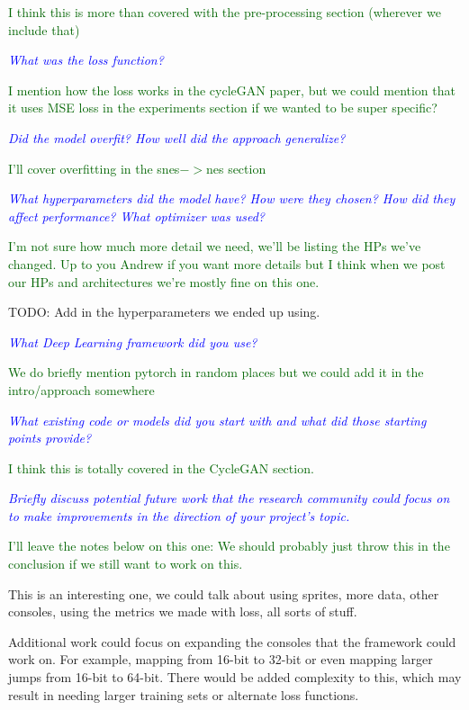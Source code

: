 \documentclass[10pt,twocolumn,letterpaper]{article}
\begin{document}
\textcolor{darkgreen}{I think this is more than covered with the pre-processing section (wherever we include that)}

\textit{\textcolor{blue}{What was the loss function?}}

\textcolor{darkgreen}{I mention how the loss works in the cycleGAN paper, but we could mention that it uses MSE loss in the experiments section if we wanted to be super specific?}

\textit{\textcolor{blue}{Did the model overfit? How well did the approach generalize?}}

\textcolor{darkgreen}{I'll cover overfitting in the snes$->$nes section}

\textit{\textcolor{blue}{What hyperparameters did the model have? How were they chosen? How did they affect performance? What optimizer was used?}}

\textcolor{darkgreen}{I'm not sure how much more detail we need, we'll be listing the HPs we've changed. Up to you Andrew if you want more details but I think when we post our HPs and architectures we're mostly fine on this one.}

TODO: Add in the hyperparameters we ended up using.

\textit{\textcolor{blue}{What Deep Learning framework did you use?}}

\textcolor{darkgreen}{We do briefly mention pytorch in random places but we could add it in the intro/approach somewhere}

\textit{\textcolor{blue}{What existing code or models did you start with and what did those starting points provide?}}

\textcolor{darkgreen}{I think this is totally covered in the CycleGAN section.}

\textit{\textcolor{blue}{Briefly discuss potential future work that the research community could focus on to make improvements in the direction of your project's topic.}}

\textcolor{darkgreen}{I'll leave the notes below on this one: We should probably just throw this in the conclusion if we still want to work on this.}

This is an interesting one, we could talk about using sprites, more data, other consoles, using the metrics we made with loss, all sorts of stuff.

Additional work could focus on expanding the consoles that the framework could work on. For example, mapping from 16-bit to 32-bit or even mapping larger jumps from 16-bit to 64-bit. There would be added complexity to this, which may result in needing larger training sets or alternate loss functions.
\end{document}
